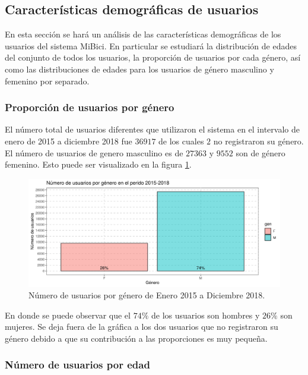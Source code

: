 \subsection{Características demográficas de usuarios}

En esta sección se hará un análisis de las características demográficas de los usuarios del sistema MiBici. En particular se estudiará la distribución de edades del conjunto de todos los usuarios, la proporción de usuarios por cada género, así como las distribuciones de edades para los usuarios de género masculino y femenino por separado.

\subsubsection{Proporción de usuarios por género}

El número total de usuarios diferentes que utilizaron el sistema en el intervalo de enero de 2015 a diciembre 2018 fue $36917$ de los cuales $2$ no registraron su género. El número de usuarios de genero masculino es de $27363$ y $9552$ son de género femenino. Esto puede ser visualizado en la figura \ref{fig:genderprop}.

\begin{figure}[H]
	\centering
	\includegraphics[width=14cm]{Graphics/genderProp}
	\caption{Número de usuarios por género de Enero 2015 a Diciembre 2018.}
	\label{fig:genderprop}
\end{figure}

En donde se puede observar que el $74\%$ de los usuarios son hombres y $26\%$ son mujeres. Se deja fuera de la gráfica a los dos usuarios que no registraron su género debido a que su contribución a las proporciones es muy pequeña.

\subsubsection*{Número de usuarios por edad}

